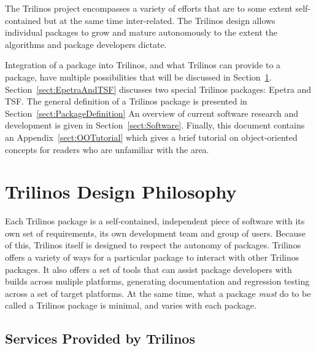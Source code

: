 \documentclass[12pt,relax]{SANDreport}
\begin{document}
The Trilinos project encompasses a variety of efforts that are to some
extent self-contained but at the same time inter-related.  The
Trilinos design allows individual packages to grow and mature
autonomously to the extent the algorithms and package developers
dictate. 

Integration of a package into Trilinos, and what Trilinos can provide
to a package, have multiple possibilities
that will be discussed in Section~\ref{sect:TrilinosDesign}.
Section~\ref{sect:EpetraAndTSF} discusses two special Trilinos
packages: Epetra and TSF.  The general definition of a Trilinos
package is presented in Section~\ref{sect:PackageDefinition}
An overview of current software research and
development is given in Section~\ref{sect:Software}.  
Finally, this document contains
an Appendix~\ref{sect:OOTutorial} which gives a brief
tutorial on object-oriented concepts for readers who are unfamiliar
with the area.  

\section{Trilinos Design Philosophy}
\label{sect:TrilinosDesign}
Each Trilinos package is a self-contained, independent piece
of software with its own set of requirements, its own development team
and group of users.  Because of this,
Trilinos itself is designed to respect the autonomy of packages.
Trilinos offers a variety of ways for a particular package to interact with other
Trilinos packages.  It also offers a set of tools that can
assist package developers with builds across muliple platforms, generating
documentation and regression testing across a set of target platforms.
At the same time, what a package {\it must} do to be called a Trilinos
package is minimal, and varies with each package.

\subsection{Services Provided by Trilinos}
\end{document}
